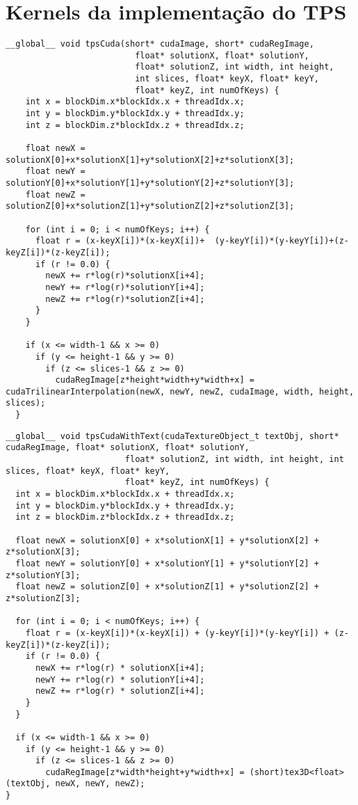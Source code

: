 \chapter{Kernels da implementação do TPS}\label{kernelCode}

\begin{lstlisting}[label={code:tpsBasic}, caption={Kernel sem nenhum tipo de melhoria}]
  __global__ void tpsCuda(short* cudaImage, short* cudaRegImage,
                          float* solutionX, float* solutionY,
                          float* solutionZ, int width, int height,
                          int slices, float* keyX, float* keyY,
                          float* keyZ, int numOfKeys) {
    int x = blockDim.x*blockIdx.x + threadIdx.x;
    int y = blockDim.y*blockIdx.y + threadIdx.y;
    int z = blockDim.z*blockIdx.z + threadIdx.z;

    float newX = solutionX[0]+x*solutionX[1]+y*solutionX[2]+z*solutionX[3];
    float newY = solutionY[0]+x*solutionY[1]+y*solutionY[2]+z*solutionY[3];
    float newZ = solutionZ[0]+x*solutionZ[1]+y*solutionZ[2]+z*solutionZ[3];

    for (int i = 0; i < numOfKeys; i++) {
      float r = (x-keyX[i])*(x-keyX[i])+  (y-keyY[i])*(y-keyY[i])+(z-keyZ[i])*(z-keyZ[i]);
      if (r != 0.0) {
        newX += r*log(r)*solutionX[i+4];
        newY += r*log(r)*solutionY[i+4];
        newZ += r*log(r)*solutionZ[i+4];
      }
    }

    if (x <= width-1 && x >= 0)
      if (y <= height-1 && y >= 0)
        if (z <= slices-1 && z >= 0)
          cudaRegImage[z*height*width+y*width+x] = cudaTrilinearInterpolation(newX, newY, newZ, cudaImage, width, height, slices);
  }
\end{lstlisting}

\begin{lstlisting}[label={code:tpsTexture}, caption={Kernel utilizando mapeamento da imagem para textura}]
__global__ void tpsCudaWithText(cudaTextureObject_t textObj, short* cudaRegImage, float* solutionX, float* solutionY,
                        float* solutionZ, int width, int height, int slices, float* keyX, float* keyY,
                        float* keyZ, int numOfKeys) {
  int x = blockDim.x*blockIdx.x + threadIdx.x;
  int y = blockDim.y*blockIdx.y + threadIdx.y;
  int z = blockDim.z*blockIdx.z + threadIdx.z;

  float newX = solutionX[0] + x*solutionX[1] + y*solutionX[2] + z*solutionX[3];
  float newY = solutionY[0] + x*solutionY[1] + y*solutionY[2] + z*solutionY[3];
  float newZ = solutionZ[0] + x*solutionZ[1] + y*solutionZ[2] + z*solutionZ[3];

  for (int i = 0; i < numOfKeys; i++) {
    float r = (x-keyX[i])*(x-keyX[i]) + (y-keyY[i])*(y-keyY[i]) + (z-keyZ[i])*(z-keyZ[i]);
    if (r != 0.0) {
      newX += r*log(r) * solutionX[i+4];
      newY += r*log(r) * solutionY[i+4];
      newZ += r*log(r) * solutionZ[i+4];
    }
  }

  if (x <= width-1 && x >= 0)
    if (y <= height-1 && y >= 0)
      if (z <= slices-1 && z >= 0)
        cudaRegImage[z*width*height+y*width+x] = (short)tex3D<float>(textObj, newX, newY, newZ);
}
\end{lstlisting}

